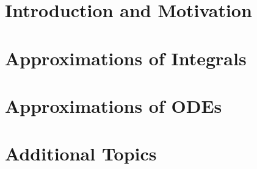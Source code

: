 \documentclass[british,11pt,a4paper]{report}
\begin{document}
\maketitle
\tableofcontents

\chapter{Introduction and Motivation}

\chapter{Approximations of Integrals}

\chapter{Approximations of ODEs}

\chapter{Additional Topics}

\end{document}
